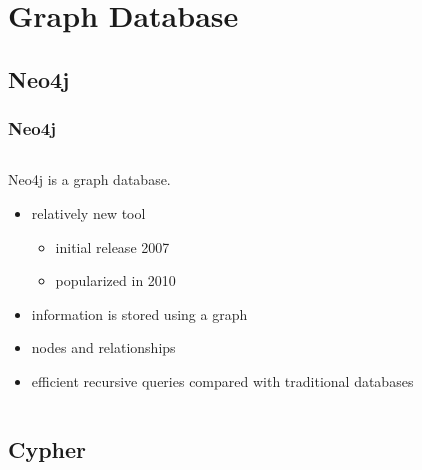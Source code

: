 \documentclass{beamer}
\begin{document}


\section[Graph DB]{Graph Database}
\subsection{Neo4j}

\begin{frame}
	\frametitle{Neo4j}
	
	
	
\begin{columns} 
\begin{column}{0.60 \textwidth}
Neo4j is a graph database.
		\begin{itemize}
		\item relatively new tool
			\begin{itemize}
			\item initial release 2007
			\item popularized in 2010
			\end{itemize}
		\item information is stored using a graph
		\item nodes and relationships
		\item efficient recursive queries compared with traditional databases
		\end{itemize}
		\end{column}
		\begin{column}{0.40\textwidth}
       \\
  \end{column}
  \end{columns}

\end{frame}

\subsection{Cypher}
\end{document}
